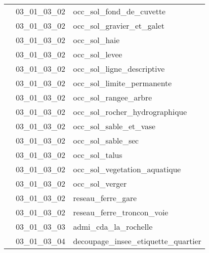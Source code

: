 \documentclass[12pt,titlepage]{book}
\begin{document}
\begin{supertabular}{|p{10cm}|c|p{15cm}|}
                    & 03\_01\_03\_02 & occ\_sol\_fond\_de\_cuvette\\


                    & 03\_01\_03\_02 & occ\_sol\_gravier\_et\_galet\\


                    & 03\_01\_03\_02 & occ\_sol\_haie\\


                    & 03\_01\_03\_02 & occ\_sol\_levee\\


                    & 03\_01\_03\_02 & occ\_sol\_ligne\_descriptive\\


                    & 03\_01\_03\_02 & occ\_sol\_limite\_permanente\\


                    & 03\_01\_03\_02 & occ\_sol\_rangee\_arbre\\


                    & 03\_01\_03\_02 & occ\_sol\_rocher\_hydrographique\\


                    & 03\_01\_03\_02 & occ\_sol\_sable\_et\_vase\\


                    & 03\_01\_03\_02 & occ\_sol\_sable\_sec\\


                    & 03\_01\_03\_02 & occ\_sol\_talus\\


                    & 03\_01\_03\_02 & occ\_sol\_vegetation\_aquatique\\


                    & 03\_01\_03\_02 & occ\_sol\_verger\\


                    & 03\_01\_03\_02 & reseau\_ferre\_gare\\


                    & 03\_01\_03\_02 & reseau\_ferre\_troncon\_voie\\


                    & 03\_01\_03\_03 & admi\_cda\_la\_rochelle\\


                    & 03\_01\_03\_04 & decoupage\_insee\_etiquette\_quartier\\



\end{supertabular}
\end{document}
